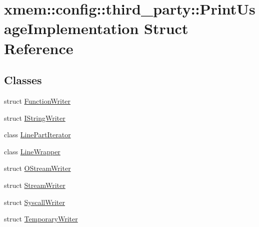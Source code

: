 \hypertarget{structxmem_1_1config_1_1third__party_1_1_print_usage_implementation}{}\section{xmem\+:\+:config\+:\+:third\+\_\+party\+:\+:Print\+Usage\+Implementation Struct Reference}
\label{structxmem_1_1config_1_1third__party_1_1_print_usage_implementation}
\subsection*{Classes}
\begin{DoxyCompactItemize}
\item 
struct \hyperlink{structxmem_1_1config_1_1third__party_1_1_print_usage_implementation_1_1_function_writer}{Function\+Writer}
\item 
struct \hyperlink{structxmem_1_1config_1_1third__party_1_1_print_usage_implementation_1_1_i_string_writer}{I\+String\+Writer}
\item 
class \hyperlink{classxmem_1_1config_1_1third__party_1_1_print_usage_implementation_1_1_line_part_iterator}{Line\+Part\+Iterator}
\item 
class \hyperlink{classxmem_1_1config_1_1third__party_1_1_print_usage_implementation_1_1_line_wrapper}{Line\+Wrapper}
\item 
struct \hyperlink{structxmem_1_1config_1_1third__party_1_1_print_usage_implementation_1_1_o_stream_writer}{O\+Stream\+Writer}
\item 
struct \hyperlink{structxmem_1_1config_1_1third__party_1_1_print_usage_implementation_1_1_stream_writer}{Stream\+Writer}
\item 
struct \hyperlink{structxmem_1_1config_1_1third__party_1_1_print_usage_implementation_1_1_syscall_writer}{Syscall\+Writer}
\item 
struct \hyperlink{structxmem_1_1config_1_1third__party_1_1_print_usage_implementation_1_1_temporary_writer}{Temporary\+Writer}
\end{DoxyCompactItemize}
